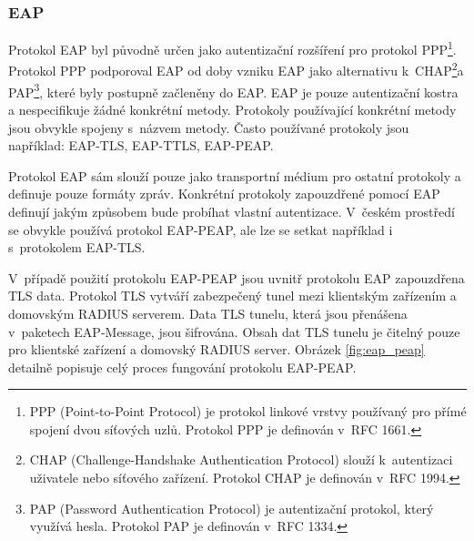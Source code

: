 \documentclass[thesis=M,czech]{FITthesis}[2012/06/26]
\begin{document}
  \subsubsection{EAP}
    
    Protokol EAP byl původně určen jako autentizační rozšíření pro protokol PPP\footnote{
      PPP (Point-to-Point Protocol) je protokol linkové vrstvy používaný pro přímé
      spojení dvou síťových uzlů.
      Protokol PPP je definován v~RFC 1661.
    }.
    Protokol PPP podporoval EAP od doby vzniku EAP jako alternativu k~CHAP\footnote{
      CHAP (Challenge-Handshake Authentication Protocol) slouží k~autentizaci
      uživatele nebo síťového zařízení.
      Protokol CHAP je definován v~RFC 1994.
    }a PAP\footnote{
      PAP (Password Authentication Protocol) je autentizační protokol, který využívá hesla.
      Protokol PAP je definován v~RFC 1334.
    }, které byly postupně začleněny do EAP.
    EAP je pouze autentizační kostra a nespecifikuje žádné konkrétní metody.
    Protokoly používající konkrétní metody jsou obvykle spojeny s~názvem metody.
    Často používané protokoly jsou například: EAP-TLS, EAP-TTLS, EAP-PEAP.
    
    Protokol EAP sám slouží pouze jako transportní médium pro ostatní protokoly
    a definuje pouze formáty zpráv\cite{rfc3748}.
    Konkrétní protokoly zapouzdřené pomocí EAP definují jakým způsobem 
    bude probíhat vlastní autentizace.
    V~českém prostředí se obvykle používá protokol EAP-PEAP,
    ale lze se setkat například i s~protokolem EAP-TLS.

    V~případě použití protokolu EAP-PEAP jsou uvnitř
    protokolu EAP zapouzdřena TLS data.
    Protokol TLS vytváří zabezpečený tunel mezi klientským
    zařízením a domovským RADIUS serverem.
    Data TLS tunelu, která jsou přenášena v~paketech EAP-Message, jsou šifrována.
    Obsah dat TLS tunelu je čitelný pouze pro klientské zařízení a domovský RADIUS server.
    Obrázek \ref{fig:eap_peap} detailně popisuje celý proces fungování protokolu EAP-PEAP.
    
\end{document}
